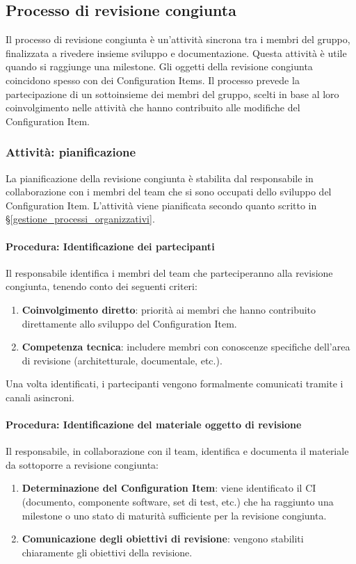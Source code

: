 \documentclass[a4paper,12pt]{article}
\begin{document}
\subsection{Processo di revisione congiunta}\label{proc_revisione_congiunta}
Il processo di revisione congiunta è un'attività sincrona tra i membri del
gruppo, finalizzata a rivedere insieme sviluppo e documentazione. Questa attività è utile quando si raggiunge una milestone. Gli oggetti della revisione congiunta coincidono spesso con dei Configuration Items. Il processo prevede la partecipazione di un sottoinsieme dei membri del gruppo, scelti in base al loro coinvolgimento nelle attività che hanno contribuito alle modifiche del Configuration Item.

\subsubsection{Attività: pianificazione}
La pianificazione della revisione congiunta è stabilita dal responsabile in
collaborazione con i membri del team che si sono occupati dello sviluppo del
Configuration Item. L'attività viene pianificata secondo quanto scritto in
§\ref{gestione_processi_organizzativi}.

\paragraph{Procedura: Identificazione dei partecipanti}
Il responsabile identifica i membri del team che parteciperanno alla revisione
congiunta, tenendo conto dei seguenti criteri:
\begin{enumerate}
    \item \textbf{Coinvolgimento diretto}: priorità ai membri che hanno contribuito direttamente allo sviluppo del Configuration Item.
    \item \textbf{Competenza tecnica}: includere membri con conoscenze specifiche dell'area di revisione (architetturale, documentale, etc.).
\end{enumerate}
Una volta identificati, i partecipanti vengono formalmente comunicati tramite i canali asincroni.

\paragraph{Procedura: Identificazione del materiale oggetto di revisione}
Il responsabile, in collaborazione con il team, identifica e documenta il
materiale da sottoporre a revisione congiunta:
\begin{enumerate}
    \item \textbf{Determinazione del Configuration Item}: viene identificato il CI (documento, componente software, set di test, etc.) che ha raggiunto una milestone o uno stato di maturità sufficiente per la revisione congiunta.
    \item \textbf{Comunicazione degli obiettivi di revisione}: vengono stabiliti chiaramente gli obiettivi della revisione.
\end{enumerate}
\end{document}
